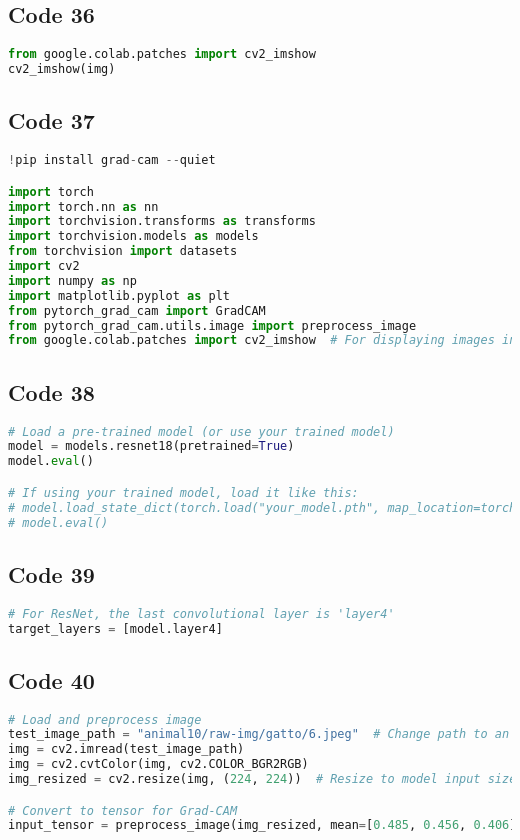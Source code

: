\documentclass{article}
\begin{document}
\subsection*{Code 36}
\begin{lstlisting}[language=Python]
from google.colab.patches import cv2_imshow
cv2_imshow(img)

\end{lstlisting}

\subsection*{Code 37}
\begin{lstlisting}[language=Python]
!pip install grad-cam --quiet

import torch
import torch.nn as nn
import torchvision.transforms as transforms
import torchvision.models as models
from torchvision import datasets
import cv2
import numpy as np
import matplotlib.pyplot as plt
from pytorch_grad_cam import GradCAM
from pytorch_grad_cam.utils.image import preprocess_image
from google.colab.patches import cv2_imshow  # For displaying images in Colab

\end{lstlisting}

\subsection*{Code 38}
\begin{lstlisting}[language=Python]
# Load a pre-trained model (or use your trained model)
model = models.resnet18(pretrained=True)
model.eval()

# If using your trained model, load it like this:
# model.load_state_dict(torch.load("your_model.pth", map_location=torch.device('cpu')))
# model.eval()

\end{lstlisting}

\subsection*{Code 39}
\begin{lstlisting}[language=Python]
# For ResNet, the last convolutional layer is 'layer4'
target_layers = [model.layer4]

\end{lstlisting}

\subsection*{Code 40}
\begin{lstlisting}[language=Python]
# Load and preprocess image
test_image_path = "animal10/raw-img/gatto/6.jpeg"  # Change path to an actual image
img = cv2.imread(test_image_path)
img = cv2.cvtColor(img, cv2.COLOR_BGR2RGB)
img_resized = cv2.resize(img, (224, 224))  # Resize to model input size

# Convert to tensor for Grad-CAM
input_tensor = preprocess_image(img_resized, mean=[0.485, 0.456, 0.406], std=[0.229, 0.224, 0.225])
\end{lstlisting}
\end{document}
